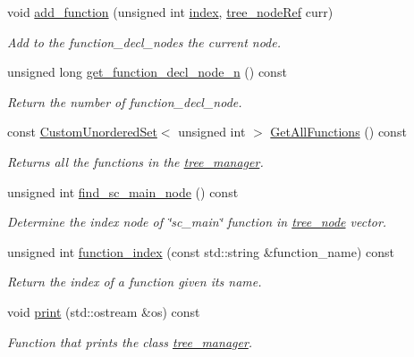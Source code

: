 \begin{DoxyCompactItemize}
void \hyperlink{classtree__manager_a00ae3af2a37d748903a83989b2b6e567}{add\+\_\+function} (unsigned int \hyperlink{tutorial__pact__2019_2Introduction_2third_2include_2Keccak_8h_a028c9bdc8344cca38ab522a337074797}{index}, \hyperlink{tree__node_8hpp_a6ee377554d1c4871ad66a337eaa67fd5}{tree\+\_\+node\+Ref} curr)
\begin{DoxyCompactList}\small\item\em Add to the function\+\_\+decl\+\_\+nodes the current node. \end{DoxyCompactList}\item 
unsigned long \hyperlink{classtree__manager_a730bac06420142bd407142fb2bd274a5}{get\+\_\+function\+\_\+decl\+\_\+node\+\_\+n} () const
\begin{DoxyCompactList}\small\item\em Return the number of function\+\_\+decl\+\_\+node. \end{DoxyCompactList}\item 
const \hyperlink{classCustomUnorderedSet}{Custom\+Unordered\+Set}$<$ unsigned int $>$ \hyperlink{classtree__manager_a4371ea7d0da5c860644a78af338764b3}{Get\+All\+Functions} () const
\begin{DoxyCompactList}\small\item\em Returns all the functions in the \hyperlink{classtree__manager}{tree\+\_\+manager}. \end{DoxyCompactList}\item 
unsigned int \hyperlink{classtree__manager_a2bf93600d8a99ad30880216fa12c929f}{find\+\_\+sc\+\_\+main\+\_\+node} () const
\begin{DoxyCompactList}\small\item\em Determine the index node of \char`\"{}sc\+\_\+main\char`\"{} function in \hyperlink{classtree__node}{tree\+\_\+node} vector. \end{DoxyCompactList}\item 
unsigned int \hyperlink{classtree__manager_aada163f9f7e3d56944cb7b4d73329609}{function\+\_\+index} (const std\+::string \&function\+\_\+name) const
\begin{DoxyCompactList}\small\item\em Return the index of a function given its name. \end{DoxyCompactList}\item 
void \hyperlink{classtree__manager_aabc0b7559aef6d75af506b5023f4d49b}{print} (std\+::ostream \&os) const
\begin{DoxyCompactList}\small\item\em Function that prints the class \hyperlink{classtree__manager}{tree\+\_\+manager}. \end{DoxyCompactList}\item 

\end{DoxyCompactItemize}
